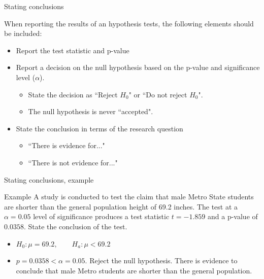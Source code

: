\documentclass[xcolor=table, aspectratio=169, bigger, handout]{beamer}
\begin{document}
\begin{frame}{Stating conclusions}
\begin{block}{}
When reporting the results of an hypothesis tests, the following elements should be included:
\begin{itemize}
\pause\item Report the test statistic and p-value
\pause\item Report a decision on the null hypothesis based on the p-value and significance level ($\alpha$). 
\begin{itemize}
\item State the decision as ``Reject $H_0$" or ``Do not reject $H_0$".
\item The null hypothesis is never ``accepted".
\end{itemize}
\pause\item State the conclusion in terms of the research question
\begin{itemize}
\item ``There is evidence for..."
\item ``There is not evidence for..."
\end{itemize}
\end{itemize}
\end{block}
\end{frame}

\begin{frame}{Stating conclusions, example}
\begin{exampleblock}{Example}
A study is conducted to test the claim that male Metro State students are shorter than the general population height of 69.2 inches. The test at a $\alpha=0.05$ level of significance produces a test statistic $t=-1.859$ and a p-value of $0.0358$. State the conclusion of the test.
\begin{itemize}
\pause\item $H_0: \mu=69.2, \qquad H_a: \mu < 69.2$
\pause\item $p=0.0358 < \alpha = 0.05$. Reject the null hypothesis. There is evidence to conclude that male Metro students are shorter than the general population.
\end{itemize}
\end{exampleblock}
\end{frame}
\end{document}
